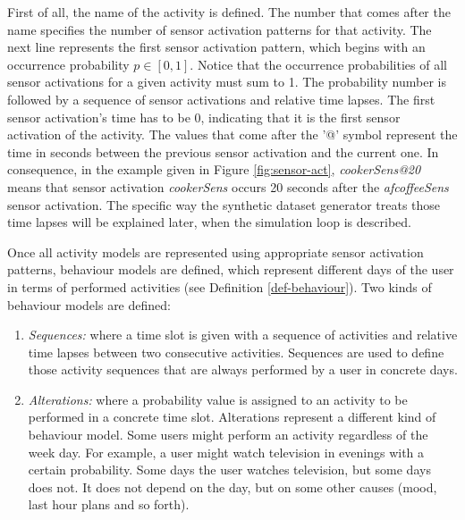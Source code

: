 First of all, the name of the activity is defined. The number that comes after the name specifies the number of sensor activation patterns for that activity. The next line represents the first sensor activation pattern, which begins with an occurrence probability $p \in [0, 1]$. Notice that the occurrence probabilities of all sensor activations for a given activity must sum to 1. The probability number is followed by a sequence of sensor activations and relative time lapses. The first sensor activation's time has to be 0, indicating that it is the first sensor activation of the activity. The values that come after the '@' symbol represent the time in seconds between the previous sensor activation and the current one. In consequence, in the example given in Figure \ref{fig:sensor-act}, \textit{cookerSens@20} means that sensor activation \textit{cookerSens} occurs 20 seconds after the \textit{afcoffeeSens} sensor activation. The specific way the synthetic dataset generator treats those time lapses will be explained later, when the simulation loop is described.

Once all activity models are represented using appropriate sensor activation patterns, behaviour models are defined, which represent different days of the user in terms of performed activities (see Definition \ref{def-behaviour}). Two kinds of behaviour models are defined: 

\begin{enumerate}
 \item \textit{Sequences:} where a time slot is given with a sequence of activities and relative time lapses between two consecutive activities. Sequences are used to define those activity sequences that are always performed by a user in concrete days.
 \item \textit{Alterations:} where a probability value is assigned to an activity to be performed in a concrete time slot. Alterations represent a different kind of behaviour model. Some users might perform an activity regardless of the week day. For example, a user might watch television in evenings with a certain probability. Some days the user watches television, but some days does not. It does not depend on the day, but on some other causes (mood, last hour plans and so forth).
\end{enumerate}

